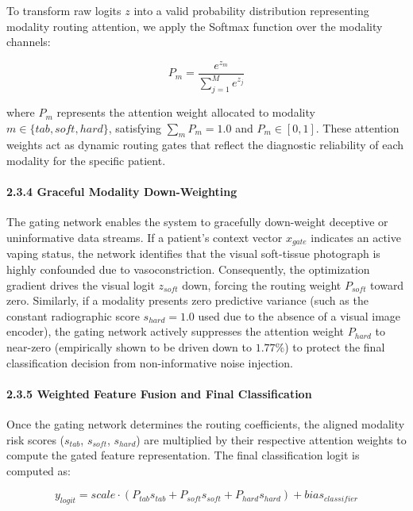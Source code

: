 \documentclass[
]{article}
\begin{document}
To transform raw logits \(z\) into a valid probability distribution
representing modality routing attention, we apply the Softmax function
over the modality channels:

\[P_{m} = \frac{e^{z_{m}}}{\sum_{j = 1}^{M}e^{z_{j}}}\]

where \(P_{m}\) represents the attention weight allocated to modality
\(m \in \{ tab,soft,hard\}\), satisfying \(\sum_{m}^{}P_{m} = 1.0\) and
\(P_{m} \in [ 0,1]\). These attention weights act as dynamic routing
gates that reflect the diagnostic reliability of each modality for the
specific patient.

\paragraph{\texorpdfstring{\textbf{2.3.4 Graceful Modality
Down-Weighting}}{2.3.4 Graceful Modality Down-Weighting}}\label{graceful-modality-down-weighting}

The gating network enables the system to gracefully down-weight
deceptive or uninformative data streams. If a patient's context vector
\(x_{gate}\) indicates an active vaping status, the network identifies
that the visual soft-tissue photograph is highly confounded due to
vasoconstriction. Consequently, the optimization gradient drives the
visual logit \(z_{soft}\) down, forcing the routing weight \(P_{soft}\)
toward zero. Similarly, if a modality presents zero predictive variance
(such as the constant radiographic score \(s_{hard} = 1.0\) used due to
the absence of a visual image encoder), the gating network actively
suppresses the attention weight \(P_{hard}\) to near-zero (empirically
shown to be driven down to \(1.77\%\)) to protect the final
classification decision from non-informative noise injection.

\paragraph{\texorpdfstring{\textbf{2.3.5 Weighted Feature Fusion and
Final
Classification}}{2.3.5 Weighted Feature Fusion and Final Classification}}\label{weighted-feature-fusion-and-final-classification}

Once the gating network determines the routing coefficients, the aligned
modality risk scores (\(s_{tab}\), \(s_{soft}\), \(s_{hard}\)) are
multiplied by their respective attention weights to compute the gated
feature representation. The final classification logit is computed as:

\[y_{logit} = scale \cdot \left( P_{tab}s_{tab} + P_{soft}s_{soft} + P_{hard}s_{hard} \right) + bias_{classifier}\]
\end{document}
